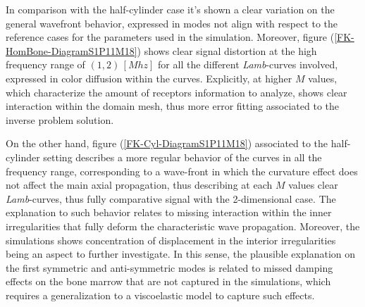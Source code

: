 In comparison with the half-cylinder case it's shown a clear variation on the general wavefront behavior, expressed in modes not align with respect to the reference cases for the parameters used in the simulation. Moreover, figure (\ref{FK-HomBone-DiagramS1P11M18}) shows clear signal distortion at the high frequency range of $(1, 2)\, [Mhz]$ for all the different \textit{Lamb}-curves involved, expressed in color diffusion within the curves. Explicitly, at higher $M$ values, which characterize the amount of receptors information to analyze, shows clear interaction within the domain mesh, thus more error fitting associated to the inverse problem solution.

On the other hand, figure (\ref{FK-Cyl-DiagramS1P11M18}) associated to the half-cylinder setting describes a more regular behavior of the curves in all the frequency range, corresponding to a wave-front in which the curvature effect does not affect the main axial propagation, thus describing at each $M$ values clear \textit{Lamb}-curves, thus fully comparative signal with the 2-dimensional case. The explanation to such behavior relates to missing interaction within the inner irregularities that fully deform the characteristic wave propagation. Moreover, the simulations shows concentration of displacement in the interior irregularities being an aspect to further investigate. In this sense, the plausible explanation on the first symmetric and anti-symmetric modes is related to missed damping effects on the bone marrow that are not captured in the simulations, which requires a generalization to a viscoelastic model to capture such effects.


